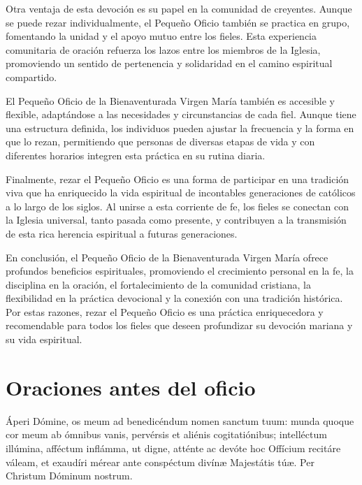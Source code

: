 \documentclass[12pt,a5paper,openright]{memoir}
\begin{document}
Otra ventaja de esta devoción es su papel en la comunidad de creyentes. Aunque se puede rezar individualmente, el Pequeño Oficio también se practica en grupo, fomentando la unidad y el apoyo mutuo entre los fieles. Esta experiencia comunitaria de oración refuerza los lazos entre los miembros de la Iglesia, promoviendo un sentido de pertenencia y solidaridad en el camino espiritual compartido.

El Pequeño Oficio de la Bienaventurada Virgen María también es accesible y flexible, adaptándose a las necesidades y circunstancias de cada fiel. Aunque tiene una estructura definida, los individuos pueden ajustar la frecuencia y la forma en que lo rezan, permitiendo que personas de diversas etapas de vida y con diferentes horarios integren esta práctica en su rutina diaria.

Finalmente, rezar el Pequeño Oficio es una forma de participar en una tradición viva que ha enriquecido la vida espiritual de incontables generaciones de católicos a lo largo de los siglos. Al unirse a esta corriente de fe, los fieles se conectan con la Iglesia universal, tanto pasada como presente, y contribuyen a la transmisión de esta rica herencia espiritual a futuras generaciones.

En conclusión, el Pequeño Oficio de la Bienaventurada Virgen María ofrece profundos beneficios espirituales, promoviendo el crecimiento personal en la fe, la disciplina en la oración, el fortalecimiento de la comunidad cristiana, la flexibilidad en la práctica devocional y la conexión con una tradición histórica. Por estas razones, rezar el Pequeño Oficio es una práctica enriquecedora y recomendable para todos los fieles que deseen profundizar su devoción mariana y su vida espiritual.





\cleardoublepage
\chapter*{Oraciones antes del oficio}

\startParallel
Áperi Dómine, os meum \redgrecross ad benedicéndum nomen sanctum tuum: munda quoque cor meum \redgrecross ab ómnibus vanis, pervérsis et aliénis cogitatiónibus; intelléctum illúmina, afféctum inflámma, ut digne, atténte ac devóte hoc Offícium recitáre váleam, et exaudíri mérear ante conspéctum divínæ Majestátis túæ. Per Christum Dóminum nostrum.
\end{document}
